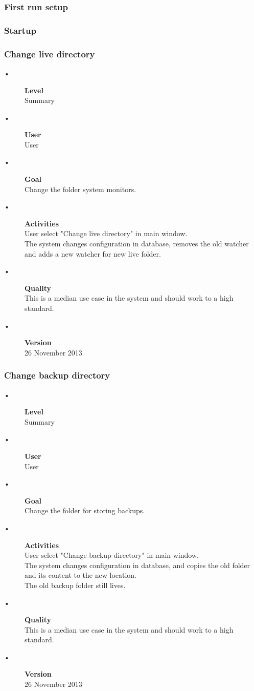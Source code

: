 \documentclass[12pt,a4paper]{article}
\begin{document}
\subsubsection{First run setup}
\subsubsection{Startup}
\subsubsection{Change live directory}
\begin{description}
	\item[•] \textbf{Level} \hfill \\
	Summary
	\item[•] \textbf{User} \hfill \\
	User
	\item[•] \textbf{Goal} \hfill \\
	Change the folder system monitors.
	\item[•] \textbf{Activities} \hfill \\
	User select "Change live directory" in main window.\\
	The system changes configuration in database, removes the old watcher and adds a new watcher for new live folder.\\
	\item[•] \textbf{Quality} \hfill \\
	This is a median use case in the system and should work to a high standard.
	\item[•] \textbf{Version} \hfill \\
	26 November 2013	
\end{description}
\subsubsection{Change backup directory}
\begin{description}
	\item[•] \textbf{Level} \hfill \\
	Summary
	\item[•] \textbf{User} \hfill \\
	User
	\item[•] \textbf{Goal} \hfill \\
	Change the folder for storing backups.
	\item[•] \textbf{Activities} \hfill \\
	User select "Change backup directory" in main window.\\
	The system changes configuration in database, and copies the old folder and its content to the new location.\\
	The old backup folder still lives.
	\item[•] \textbf{Quality} \hfill \\
	This is a median use case in the system and should work to a high standard.
	\item[•] \textbf{Version} \hfill \\
	26 November 2013
\end{description}	
\end{document}
